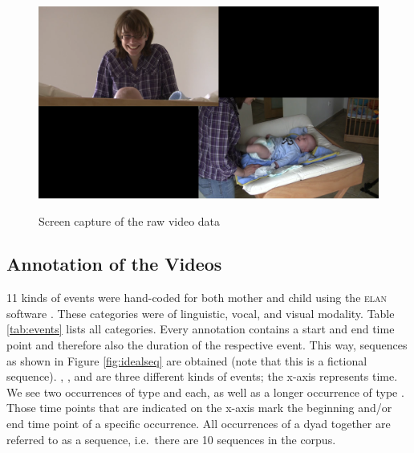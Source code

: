 \begin{figure}[h]
	\centering
	\includegraphics[width=\imgwidth]{../img/raw_video_vp_08.png}
	\label{fig:rawvid}
	\caption{Screen capture of the raw video data}
\end{figure}

\subsection{Annotation of the Videos}
\label{ssec:miningmethodannotation}
11 kinds of events were hand-coded for both mother and child using the \textsc{elan} software \citep{wittenburg06}. These categories were of linguistic, vocal, and visual modality. %
Table \ref{tab:events} lists all categories. Every annotation contains a start and end time point and therefore also the duration of the respective event. This way, sequences as shown in Figure \ref{fig:idealseq} are obtained (note that this is a fictional sequence). , , and  are three different kinds of events; the x-axis represents time. We see two occurrences of type  and  each, as well as a longer occurrence of type . Those time points that are indicated on the x-axis mark the beginning and/or end time point of a specific occurrence. All occurrences of a dyad together are referred to as a sequence, i.e.\ there are 10 sequences in the corpus.

